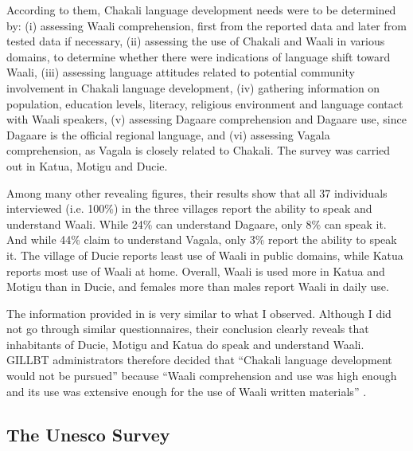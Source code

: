 According to them, Chakali language development needs were to be determined by:
(i) assessing Waali
comprehension, first from the reported data and later from tested data if
necessary, (ii) assessing the use of Chakali and Waali in various domains, to
determine whether there were indications of language shift toward Waali, (iii)
assessing language attitudes related to potential community involvement in
Chakali language development, (iv) gathering information on population,
education
levels, literacy, religious environment and language contact with Waali
speakers, (v) assessing Dagaare comprehension and Dagaare use, since Dagaare is
the official regional language, and  (vi) assessing Vagala
comprehension, as
Vagala
is closely related to Chakali. The survey was carried out in Katua, Motigu and
Ducie. 

Among many other revealing figures, their results show that all 37 individuals
interviewed (i.e. 100\%) in the three villages report the ability to speak and
understand Waali. While 24\% can understand Dagaare, only 8\% can speak it. And
while 44\% claim to understand Vagala,  only 3\% report the ability to speak
it. The village of Ducie  reports  least use of Waali in public domains, while
Katua reports most use of Waali at home. Overall, Waali is used more in
Katua and Motigu than in Ducie, and females more than males report Waali in
daily use.

The information provided in \cite{Tomp02} is very similar to what I
observed. Although I did not go through similar  questionnaires, their
conclusion clearly reveals that  inhabitants of Ducie, Motigu and Katua do speak
and understand Waali. GILLBT administrators therefore decided that ``Chakali
language development would not be pursued'' because ``Waali comprehension and
use was high enough and its use was extensive enough for the use of Waali
written materials'' \cite[23]{Tomp02}.


\subsection{The Unesco Survey}
\label{sec:SOC-unesco}


